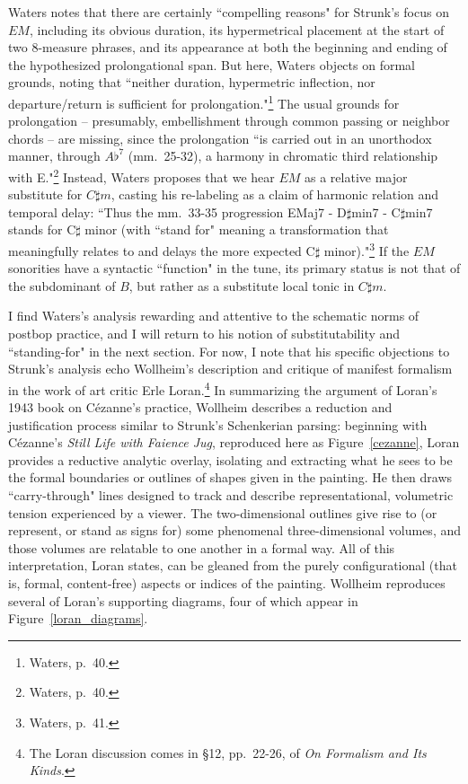 Waters notes that there are certainly ``compelling reasons" for Strunk's focus on $EM$, including its obvious duration, its hypermetrical placement at the start of two 8-measure phrases, and its appearance at both the beginning and ending of the hypothesized prolongational span.  But here, Waters objects on formal grounds, noting that ``neither duration, hypermetric inflection, nor departure/return is sufficient for prolongation."\footnote{Waters, p.\ 40.}  The usual grounds for prolongation -- presumably, embellishment through common passing or neighbor chords -- are missing, since the prolongation ``is carried out in an unorthodox manner, through $A\flat^7$ (mm.\ 25-32), a harmony in chromatic third relationship with E."\footnote{Waters, p.\ 40.}  Instead, Waters proposes that we hear $EM$ as a relative major substitute for $C\sharp m$, casting his re-labeling as a claim of harmonic relation and temporal delay: ``Thus the mm.\ 33-35 progression EMaj7 - D$\sharp$min7 - C$\sharp$min7 stands for C$\sharp$ minor (with ``stand for" meaning a transformation that meaningfully relates to and delays the more expected C$\sharp$ minor)."\footnote{Waters, p.\ 41.}  If the $EM$ sonorities have a syntactic ``function" in the tune, its primary status is not that of the subdominant of $B$, but rather as a substitute local tonic in $C\sharp m$.

I find Waters's analysis rewarding and attentive to the schematic norms of postbop practice, and I will return to his notion of substitutability and ``standing-for" in the next section.  For now, I note that his specific objections to Strunk's analysis echo Wollheim's description and critique of manifest formalism in the work of art critic Erle Loran.\footnote{The Loran discussion comes in \S 12, pp.\ 22-26, of \emph{On Formalism and Its Kinds}.}  In summarizing the argument of Loran's 1943 book on C\'{e}zanne's practice, Wollheim describes a reduction and justification process similar to Strunk's Schenkerian parsing: beginning with C\'{e}zanne's \emph{Still Life with Faience Jug}, reproduced here as Figure~\ref{cezanne}, Loran provides a reductive analytic overlay, isolating and extracting what he sees to be the formal boundaries or outlines of shapes given in the painting.  He then draws ``carry-through" lines designed to track and describe representational, volumetric tension experienced by a viewer.  The two-dimensional outlines give rise to (or represent, or stand as signs for) some phenomenal three-dimensional volumes, and those volumes are relatable to one another in a formal way.  All of this interpretation, Loran states, can be gleaned from the purely configurational (that is, formal, content-free) aspects or indices of the painting.  Wollheim reproduces several of Loran's supporting diagrams, four of which appear in Figure~\ref{loran_diagrams}.

